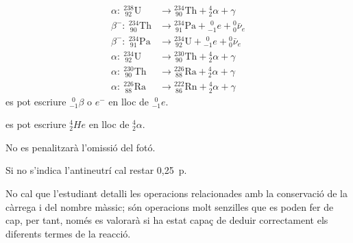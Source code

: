 \begin{solapartat}
\begin{align*}
\alpha\colon\ {}^{238}_{\ 92}\mathrm{U} &\rightarrow {}^{234}_{\ 90}\mathrm{Th} + {}^{4}_{2}\alpha + \gamma\\
\beta^-\colon\ {}^{234}_{\ 90}\mathrm{Th} &\rightarrow {}^{234}_{\ 91}\mathrm{Pa} + {}^{\ \,0}_{-1}e + {}^{0}_{0}\bar{\nu}_e\\
\beta^-\colon\ {}^{234}_{\ 91}\mathrm{Pa} &\rightarrow {}^{234}_{\ 92}\mathrm{U} + {}^{\ \,0}_{-1}e + {}^{0}_{0}\bar{\nu}_e\\
\alpha\colon\ {}^{234}_{\ 92}\mathrm{U} &\rightarrow {}^{230}_{\ 90}\mathrm{Th} + {}^{4}_{2}\alpha + \gamma\\
\alpha\colon\ {}^{230}_{\ 90}\mathrm{Th} &\rightarrow {}^{226}_{\ 88}\mathrm{Ra} + {}^{4}_{2}\alpha + \gamma\\
\alpha\colon\ {}^{226}_{\ 88}\mathrm{Ra} &\rightarrow {}^{222}_{\ 86}\mathrm{Rn} + {}^{4}_{2}\alpha + \gamma
\end{align*}
 es pot escriure ${}^{\ \,0}_{-1}\beta$ o $e^-$ en lloc de ${}^{\ \,0}_{-1}e$.

 es pot escriure ${}^{4}_{2}He$ en lloc de ${}^{4}_{2}\alpha$.

No es penalitzarà l'omissió del fotó.

Si no s'indica l'antineutrí cal restar 0,25~p.

No cal que l'estudiant detalli les operacions relacionades amb la conservació de la càrrega i del nombre màssic; són operacions molt senzilles que es poden fer de cap, per tant, només es valorarà si ha estat capaç de deduir correctament els diferents termes de la reacció.
\end{solapartat}

